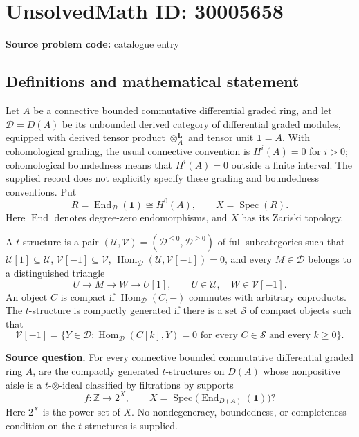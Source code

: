 \documentclass[11pt]{article}
\begin{document}
\section*{UnsolvedMath ID: 30005658}
\textbf{Source problem code:} catalogue entry
\subsection{Definitions and mathematical statement}
Let \(A\) be a connective bounded commutative differential graded ring, and let \(\mathcal D=D(A)\) be its unbounded derived category of differential graded modules, equipped with derived tensor product \(\otimes_A^{\mathbf L}\) and tensor unit \(\mathbf 1=A\). With cohomological grading, the usual connective convention is \(H^i(A)=0\) for \(i>0\); cohomological boundedness means that \(H^i(A)=0\) outside a finite interval. The supplied record does not explicitly specify these grading and boundedness conventions. Put
\[
R=\operatorname{End}_{\mathcal D}(\mathbf 1)\cong H^0(A),\qquad X=\operatorname{Spec}(R).
\]
Here \(\operatorname{End}\) denotes degree-zero endomorphisms, and \(X\) has its Zariski topology.

A \(t\)-structure is a pair \((\mathcal U,\mathcal V)=(\mathcal D^{\leq 0},\mathcal D^{\geq 0})\) of full subcategories such that \(\mathcal U[1]\subseteq\mathcal U\), \(\mathcal V[-1]\subseteq\mathcal V\), \(\operatorname{Hom}_{\mathcal D}(\mathcal U,\mathcal V[-1])=0\), and every \(M\in\mathcal D\) belongs to a distinguished triangle
\[
U\longrightarrow M\longrightarrow W\longrightarrow U[1],
\qquad U\in\mathcal U,\quad W\in\mathcal V[-1].
\]
An object \(C\) is compact if \(\operatorname{Hom}_{\mathcal D}(C,-)\) commutes with arbitrary coproducts. The \(t\)-structure is compactly generated if there is a set \(\mathcal S\) of compact objects such that
\[
\mathcal V[-1]=\bigl\{Y\in\mathcal D:\operatorname{Hom}_{\mathcal D}(C[k],Y)=0\text{ for every }C\in\mathcal S\text{ and every }k\geq 0\bigr\}.
\]

\textbf{Source question.} For every connective bounded commutative differential graded ring \(A\), are the compactly generated \(t\)-structures on \(D(A)\) whose nonpositive aisle is a \(t\)-\(\otimes\)-ideal classified by filtrations by supports
\[
f:\mathbb Z\longrightarrow 2^X,\qquad X=\operatorname{Spec}\bigl(\operatorname{End}_{D(A)}(\mathbf 1)\bigr)?
\]
Here \(2^X\) is the power set of \(X\). No nondegeneracy, boundedness, or completeness condition on the \(t\)-structures is supplied.
\end{document}
